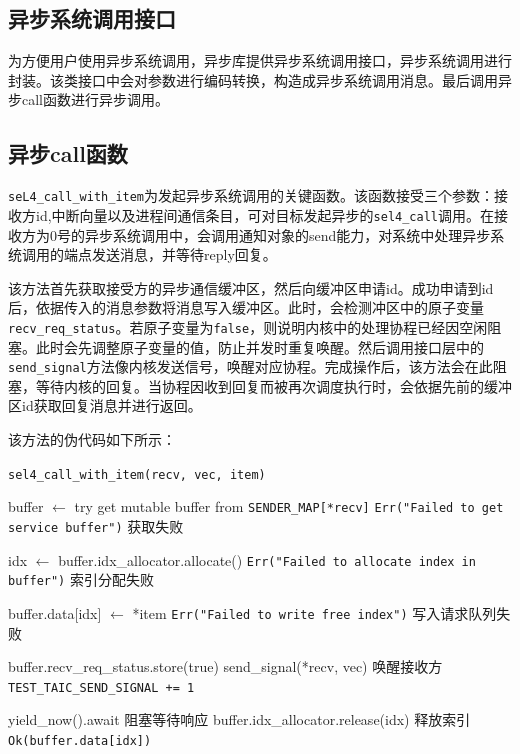 \subsection{异步系统调用接口}

为方便用户使用异步系统调用，异步库提供异步系统调用接口，异步系统调用进行封装。该类接口中会对参数进行编码转换，构造成异步系统调用消息。最后调用异步call函数进行异步调用。

\subsection{异步call函数}

\texttt{seL4\_call\_with\_item}为发起异步系统调用的关键函数。该函数接受三个参数：接收方id,中断向量以及进程间通信条目，可对目标发起异步的\texttt{sel4\_call}调用。在接收方为0号的异步系统调用中，会调用通知对象的send能力，对系统中处理异步系统调用的端点发送消息，并等待reply回复。

该方法首先获取接受方的异步通信缓冲区，然后向缓冲区申请id。成功申请到id后，依据传入的消息参数将消息写入缓冲区。此时，会检测冲区中的原子变量\texttt{recv\_req\_status}。若原子变量为\texttt{false}，则说明内核中的处理协程已经因空闲阻塞。此时会先调整原子变量的值，防止并发时重复唤醒。然后调用接口层中的\texttt{send\_signal}方法像内核发送信号，唤醒对应协程。完成操作后，该方法会在此阻塞，等待内核的回复。当协程因收到回复而被再次调度执行时，会依据先前的缓冲区id获取回复消息并进行返回。

该方法的伪代码如下所示：

\begin{algorithm}
\caption{\texttt{sel4\_call\_with\_item(recv, vec, item)}}
\begin{algorithmic}[0]  %
\State buffer $\gets$ try get mutable buffer from \texttt{SENDER\_MAP[*recv]}
    \State \Return \texttt{Err("Failed to get service buffer")} \Comment 获取失败
\EndIf

\State idx $\gets$ buffer.idx\_allocator.allocate()
    \State \Return \texttt{Err("Failed to allocate index in buffer")} \Comment 索引分配失败
\EndIf

\State buffer.data[idx] $\gets$ *item
    \State \Return \texttt{Err("Failed to write free index")} \Comment 写入请求队列失败
\EndIf

    \State buffer.recv\_req\_status.store(true)
    \State send\_signal(*recv, vec) \Comment 唤醒接收方
    \State \texttt{TEST\_TAIC\_SEND\_SIGNAL += 1}
\EndIf

\State yield\_now().await \Comment 阻塞等待响应
\State buffer.idx\_allocator.release(idx) \Comment 释放索引
\State \Return \texttt{Ok(buffer.data[idx])}
\end{algorithmic}
\end{algorithm}


